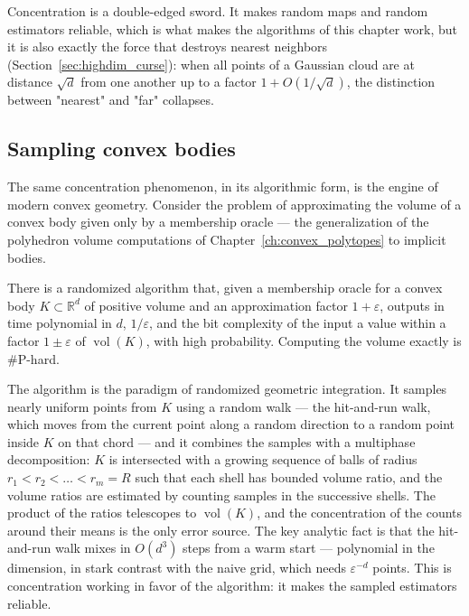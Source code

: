 \begin{remark}
Concentration is a double-edged sword. It makes random maps and random
estimators reliable, which is what makes the algorithms of this chapter
work, but it is also exactly the force that destroys nearest neighbors
(Section~\ref{sec:highdim_curse}): when all points of a Gaussian cloud are at
distance $\sqrt{d}$ from one another up to a factor $1 + O(1/\sqrt{d})$, the
distinction between "nearest" and "far" collapses.
\end{remark}

\subsection{Sampling convex bodies}

The same concentration phenomenon, in its algorithmic form, is the engine of
modern convex geometry. Consider the problem of approximating the volume of a
convex body given only by a membership oracle --- the generalization of the
polyhedron volume computations of Chapter~\ref{ch:convex_polytopes} to
implicit bodies.

\begin{theorem}
\label{thm:highdim_volume}
There is a randomized algorithm that, given a membership oracle for a convex
body $K \subset \mathbb{R}^d$ of positive volume and an approximation factor
$1 + \varepsilon$, outputs in time polynomial in $d$, $1/\varepsilon$, and
the bit complexity of the input a value within a factor $1 \pm \varepsilon$ of
$\operatorname{vol}(K)$, with high probability. Computing the volume exactly
is \#P-hard.
\end{theorem}

The algorithm is the paradigm of randomized geometric integration. It samples
nearly uniform points from $K$ using a random walk --- the hit-and-run
walk, which moves from the current point along a random direction to a random
point inside $K$ on that chord --- and it combines the samples with a
multiphase decomposition: $K$ is intersected with a growing sequence of balls
of radius $r_1 < r_2 < \dots < r_m = R$ such that each shell has bounded
volume ratio, and the volume ratios are estimated by counting samples in the
successive shells. The product of the ratios telescopes to
$\operatorname{vol}(K)$, and the concentration of the counts around their
means is the only error source. The key analytic fact is that the hit-and-run
walk mixes in $O(d^3)$ steps from a warm start --- polynomial in the
dimension, in stark contrast with the naive grid, which needs
$\varepsilon^{-d}$ points. This is concentration working in favor of the
algorithm: it makes the sampled estimators reliable.

